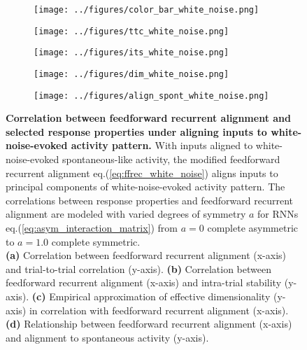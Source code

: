 \documentclass[11pt]{article}
\begin{document}
	\begin{figure}[H]
		\centering
		\begin{subfigure}[b]{0.8\textwidth}
			\centering
			\texttt{[image: ../figures/color\_bar\_white\_noise.png]}
		\end{subfigure}
		\vspace{-0.1cm}
		\newline
		\begin{subfigure}[b]{0.45\textwidth}
			\centering
			\texttt{[image: ../figures/ttc\_white\_noise.png]}
			\caption{}
		\end{subfigure}
		\hfill
		\begin{subfigure}[b]{0.45\textwidth}
			\centering
			\texttt{[image: ../figures/its\_white\_noise.png]}
			\caption{}
		\end{subfigure}
		\newline
		\begin{subfigure}[b]{0.45\textwidth}
			\centering
			\texttt{[image: ../figures/dim\_white\_noise.png]}
			\caption{}
		\end{subfigure}
		\hfill
		\begin{subfigure}[b]{0.45\textwidth}
			\centering
			\texttt{[image: ../figures/align\_spont\_white\_noise.png]}
			\caption{}
		\end{subfigure}
		\caption[Correlation between feedforward recurrent alignment and selected response properties under aligning inputs to white-noise-evoked activity pattern]{\textbf{Correlation between feedforward recurrent alignment and selected response properties under aligning inputs to white-noise-evoked activity pattern.} With inputs aligned to white-noise-evoked spontaneous-like activity, the modified feedforward recurrent alignment eq.(\ref{eq:ffrec_white_noise}) aligns inputs to principal components of white-noise-evoked activity pattern. 
		The correlations between response properties and feedforward recurrent alignment are modeled with varied degrees of symmetry $a$ for RNNs eq.(\ref{eq:asym_interaction_matrix}) from $a=0$ complete asymmetric to $a=1.0$ complete symmetric. \\
			\textbf{(a)} Correlation between feedforward recurrent alignment (x-axis) and trial-to-trial correlation (y-axis).
			\textbf{(b)} Correlation between feedforward recurrent alignment (x-axis) and intra-trial stability (y-axis).
			\textbf{(c)} Empirical approximation of effective dimensionality (y-axis) in correlation with feedforward recurrent alignment (x-axis).
			\textbf{(d)} Relationship between feedforward recurrent alignment (x-axis) and alignment to spontaneous activity (y-axis).} 
		\label{fig:ffrec_response_white_noise}
	\end{figure}
\end{document}
